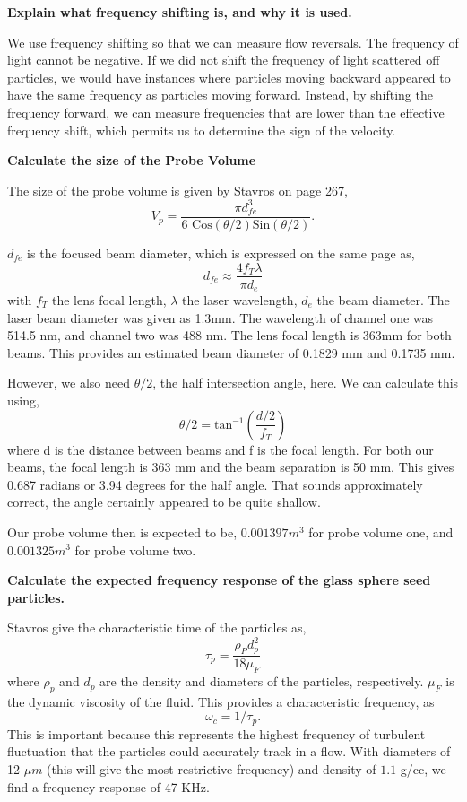 \documentclass{article}
\begin{document}
\textbf{Explain what frequency
shifting is, and why it is used.} 

We use frequency shifting so that we can measure flow
reversals. The frequency of light cannot be negative. 
If we did not shift the frequency of light scattered off
particles, we would have instances where particles moving backward
appeared to have the same frequency as particles moving
forward. Instead, by shifting the frequency forward, we can measure
frequencies that are lower than the effective frequency shift, which
permits us to determine the sign of the velocity.

\textbf{Calculate the size of the Probe Volume}

The size of the probe volume is given by Stavros on page 267, 
\begin{equation}
 V_p = \frac{\pi d_{fe}^3}{6\text{ Cos}(\theta/2)\text{
  Sin}(\theta/2)}. 
\end{equation}

$d_{fe}$ is the focused beam diameter, which is expressed on the same
page as,  
\begin{equation}
 d_{fe} \approx \frac{4f_T \lambda}{\pi d_e}
\end{equation}
with $f_T$ the lens focal length, $\lambda$ the laser wavelength, $d_e$
the beam diameter. The laser beam diameter was given as 1.3mm. The
wavelength of channel one was 514.5 nm, and channel two was 488 nm. The
lens focal length is 363mm for both beams. This provides an estimated
beam diameter of 0.1829 mm and 0.1735 mm. 

However, we also need $\theta/2$, the half intersection angle, here. We
can calculate this using, 
\begin{equation}
 \theta/2 = \text{tan}^{-1}\left(\frac{d/2}{f_T}\right)
\end{equation}
where d is the distance between beams and f is the focal length. For
both our beams, the focal length is 363 mm and the beam separation is 50
mm. This gives 0.687 radians or 3.94 degrees for the half angle. That
sounds approximately correct, the angle certainly appeared to be quite
shallow. 

Our probe volume then is expected to be, $0.001397 m^3$ for probe volume
one, and $0.001325 m^3$ for probe volume two. 

 \textbf{Calculate the expected frequency response of the glass sphere seed particles.}

Stavros give the characteristic time of the particles as, 
\begin{equation}
 \tau_p = \frac{\rho_P d_p^2}{18 \mu_F}
\end{equation}
where $\rho_p $ and $d_p$ are the density and diameters of the
particles, respectively. $\mu_F$ is the dynamic viscosity of the fluid. 
This provides a characteristic frequency, as
\begin{equation}
 \omega_c = 1/\tau_p.
\end{equation}
This is important because this represents the highest frequency of
turbulent fluctuation that the particles could accurately track in a
flow. With diameters of 12 $\mu m$ (this will give the most restrictive
frequency) and density of $1.1$ g/cc, we find a frequency response of 47
KHz. 
\end{document}
